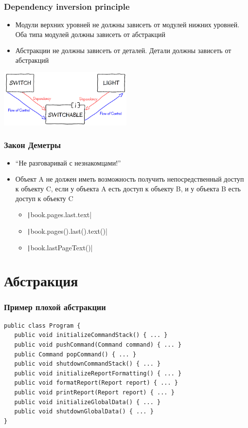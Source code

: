 \documentclass[xetex,mathserif,serif]{beamer}
\begin{document}
    \begin{frame}
        \frametitle{Dependency inversion principle}
        \begin{itemize}
            \item Модули верхних уровней не должны зависеть от модулей нижних уровней. Оба типа модулей должны зависеть от абстракций
            \item Абстракции не должны зависеть от деталей. Детали должны зависеть от абстракций
        \end{itemize}
        \begin{flushright}
            \includegraphics[width=0.5\textwidth]{dependencyInversionPrinciple.png}
        \end{flushright}
    \end{frame}

    \begin{frame}
        \frametitle{Закон Деметры}
        \begin{itemize}
            \item ``Не разговаривай с незнакомцами!''
            \item Объект A не должен иметь возможность получить непосредственный доступ к объекту C, если у объекта A есть доступ к объекту B, и у объекта B есть доступ к объекту C
            \begin{itemize}
                \item \texttt|book.pages.last.text|
                \item \texttt|book.pages().last().text()|
                \item \texttt|book.lastPageText()|
            \end{itemize}
        \end{itemize}
    \end{frame}

    \section{Абстракция}

    \begin{frame}[fragile]
        \frametitle{Пример плохой абстракции}
        \begin{verbatim}
public class Program {
   public void initializeCommandStack() { ... }
   public void pushCommand(Command command) { ... }
   public Command popCommand() { ... }
   public void shutdownCommandStack() { ... }
   public void initializeReportFormatting() { ... }
   public void formatReport(Report report) { ... }
   public void printReport(Report report) { ... }
   public void initializeGlobalData() { ... }
   public void shutdownGlobalData() { ... }
}
        \end{verbatim}
\end{frame}
\end{document}
